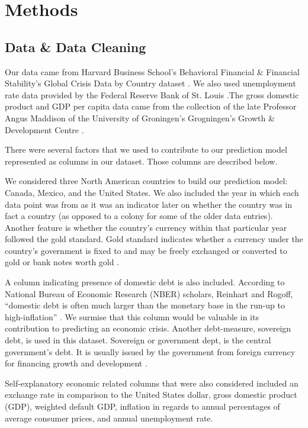 \documentclass[12pt]{article}
\begin{document}
\section{Methods}
\subsection{Data \& Data Cleaning}
Our data came from Harvard Business School’s Behavioral Financial & Financial Stability’s Global Crisis Data by Country dataset \cite{harvard}. We also used unemployment rate data provided by the Federal Reserve Bank of St. Louis \cite{fred}.The gross domestic product and GDP per capita data came from the collection of the late Professor Angus Maddison of the University of Groningen’s Grogningen’s Growth & Development Centre \cite{ggdc}.

There were several factors that we used to contribute to our prediction model represented as columns in our dataset. Those columns are described below.

We considered three North American countries to build our prediction model: Canada, Mexico, and the United States. We also included the year in which each data point was from as it was an indicator later on whether the country was in fact a country (as opposed to a colony for some of the older data entries). 
Another feature is whether the country’s currency within that particular year followed the gold standard. Gold standard indicates whether a currency under the country’s government is fixed to and may be freely exchanged or converted to gold or bank notes worth gold \cite{chengold}.

A column indicating presence of domestic debt is also included. According to National Bureau of Economic Research (NBER) scholars, Reinhart and Rogoff, “domestic debt is often much larger than the monetary base in the run-up to high-inflation” \cite{nber}. We surmise that this column would be valuable in its contribution to predicting an economic crisis. Another debt-measure, sovereign debt, is used in this dataset. Sovereign or government dept, is the central government's debt. It is usually issued by the government from foreign currency for financing growth and development \cite{chensovereign}.

Self-explanatory economic related columns that were also considered included an exchange rate in comparison to the United States dollar, gross domestic product (GDP), weighted default GDP, inflation in regards to annual percentages of average consumer prices, and annual unemployment rate. 
\end{document}
